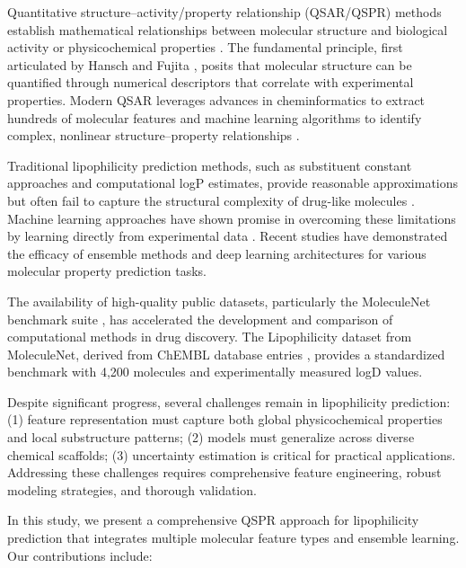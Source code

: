 \documentclass[12pt,a4paper]{article}
\begin{document}
Quantitative structure--activity/property relationship (QSAR/QSPR) methods establish mathematical relationships between molecular structure and biological activity or physicochemical properties \citep{hughes1968application}. The fundamental principle, first articulated by Hansch and Fujita \citep{hansch1962correlation}, posits that molecular structure can be quantified through numerical descriptors that correlate with experimental properties. Modern QSAR leverages advances in cheminformatics to extract hundreds of molecular features and machine learning algorithms to identify complex, nonlinear structure--property relationships \citep{wu2018moleculenet}.

Traditional lipophilicity prediction methods, such as substituent constant approaches and computational logP estimates, provide reasonable approximations but often fail to capture the structural complexity of drug-like molecules \citep{zhang2015evaluation}. Machine learning approaches have shown promise in overcoming these limitations by learning directly from experimental data \citep{taylor2015development}. Recent studies have demonstrated the efficacy of ensemble methods \citep{chen2015xgboost,dorogush2018catboost} and deep learning architectures \citep{gilmer2017neural,wallach2015atomnet} for various molecular property prediction tasks.

The availability of high-quality public datasets, particularly the MoleculeNet benchmark suite \citep{wu2018moleculenet}, has accelerated the development and comparison of computational methods in drug discovery. The Lipophilicity dataset from MoleculeNet, derived from ChEMBL database entries \citep{mansouri2016chembl}, provides a standardized benchmark with 4,200 molecules and experimentally measured logD values.

Despite significant progress, several challenges remain in lipophilicity prediction: (1) feature representation must capture both global physicochemical properties and local substructure patterns; (2) models must generalize across diverse chemical scaffolds; (3) uncertainty estimation is critical for practical applications. Addressing these challenges requires comprehensive feature engineering, robust modeling strategies, and thorough validation.

In this study, we present a comprehensive QSPR approach for lipophilicity prediction that integrates multiple molecular feature types and ensemble learning. Our contributions include:
\end{document}
